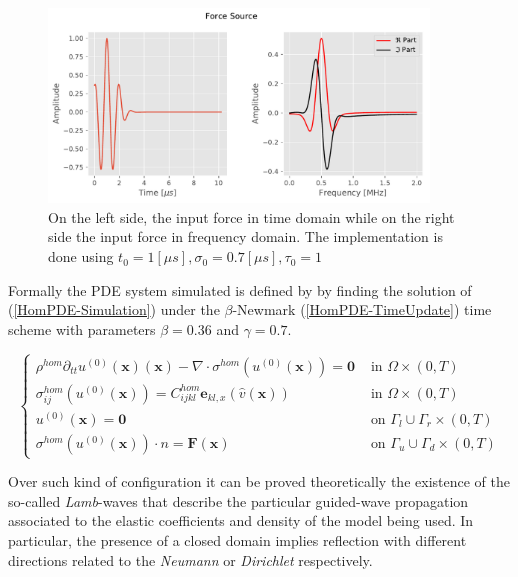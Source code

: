 \begin{figure}[!h]
	\centering
	\includegraphics[width=0.9\textwidth]{images/ImgExt/ForceSource.pdf}
	\caption{On the left side, the input force in time domain while on the right side the input force in frequency domain. The implementation is done using $t_0 = 1 [\mu s], \sigma_0 = 0.7 [\mu s], \tau_0 = 1$}
	\label{ForceSource}
\end{figure}


Formally the PDE system simulated is defined by
by finding the solution of (\ref{HomPDE-Simulation}) under the $\beta$-Newmark (\ref{HomPDE-TimeUpdate}) time scheme with parameters $\beta = 0.36$ and $\gamma = 0.7$.

\begin{equation}
    \label{HomPDE-Simulation}
    \left \{
    \begin{array}{cc}
        \rho^{hom} \partial_{tt} u^{(0)}(\mathbf{x}) (\mathbf{x}) - \nabla \cdot \sigma^{hom} (u^{(0)}(\mathbf{x}) ) = \mathbf{0} & \text{ in } \Omega \times(0,T) \\
        \sigma^{hom}_{ij}(u^{(0)}(\mathbf{x})) = C^{hom}_{ijkl}\mathbf{e}_{kl,x}(\hat{v}(\mathbf{x})) & \text{ in } \Omega\times(0,T) \\
        u^{(0)}(\mathbf{x}) = \mathbf{0} & \text{ on } \Gamma_l \cup \Gamma_r \times(0,T) \\
        \sigma^{hom}(u^{(0)}(\mathbf{x})) \cdot n = \mathbf{F}(\mathbf{x}) & \text{ on } \Gamma_u \cup \Gamma_d \times (0,T)
    \end{array}
    \right .
\end{equation}

Over such kind of configuration it can be proved theoretically the existence of the so-called \textit{Lamb}-waves that describe the particular guided-wave propagation associated to the elastic coefficients and density of the model being used.
In particular, the presence of a closed domain implies reflection with different directions related to the \textit{Neumann} or \textit{Dirichlet} respectively.


